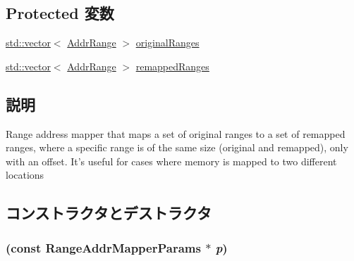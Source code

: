 \subsection*{Protected 変数}
\begin{DoxyCompactItemize}
\item 
\hyperlink{classstd_1_1vector}{std::vector}$<$ \hyperlink{classAddrRange}{AddrRange} $>$ \hyperlink{classRangeAddrMapper_a55137437ddf514203433b70c0c435aa0}{originalRanges}
\item 
\hyperlink{classstd_1_1vector}{std::vector}$<$ \hyperlink{classAddrRange}{AddrRange} $>$ \hyperlink{classRangeAddrMapper_aa478e59bbb23c79ab49039bfc312ab8e}{remappedRanges}
\end{DoxyCompactItemize}


\subsection{説明}
Range address mapper that maps a set of original ranges to a set of remapped ranges, where a specific range is of the same size (original and remapped), only with an offset. It's useful for cases where memory is mapped to two different locations 

\subsection{コンストラクタとデストラクタ}
\hypertarget{classRangeAddrMapper_a89f471283bbf7e257496688bb009e9e3}{
\subsubsection[{RangeAddrMapper}]{ (const RangeAddrMapperParams $\ast$ {\em p})}}
\label{classRangeAddrMapper_a89f471283bbf7e257496688bb009e9e3}



